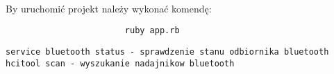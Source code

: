 \documentclass[wide,a4paper,titlepage,12pt]{article}
\begin{document}
\paragraph{} %
\label{par:}
By uruchomić projekt należy wykonać komendę:

\begin{lstlisting}
                        ruby app.rb
\end{lstlisting}


\begin{lstlisting}
service bluetooth status - sprawdzenie stanu odbiornika bluetooth
hcitool scan - wyszukanie nadajnikow bluetooth
\end{lstlisting}
\end{document}

